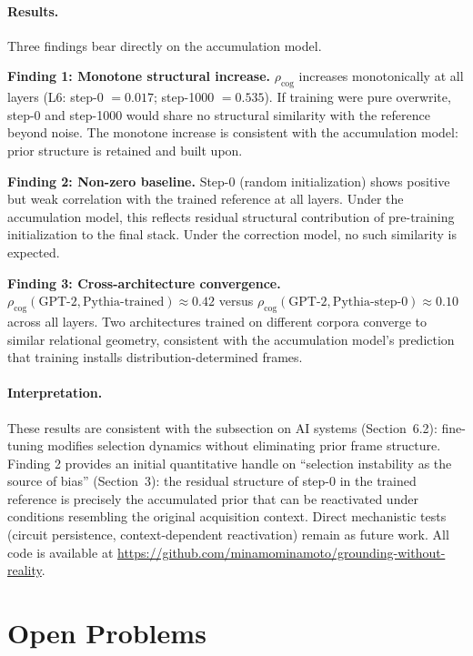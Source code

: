 \documentclass[12pt]{article}
\begin{document}
\paragraph{Results.}
Three findings bear directly on the accumulation model.

\smallskip
\noindent\textbf{Finding 1: Monotone structural increase.}
$\rho_\mathrm{cog}$ increases monotonically at all layers
(L6: step-0 $= 0.017$; step-1000 $= 0.535$).
If training were pure overwrite, step-0 and step-1000 would share
no structural similarity with the reference beyond noise.
The monotone increase is consistent with the accumulation model:
prior structure is retained and built upon.

\smallskip
\noindent\textbf{Finding 2: Non-zero baseline.}
Step-0 (random initialization) shows positive but weak correlation
with the trained reference at all layers.
Under the accumulation model, this reflects residual structural
contribution of pre-training initialization to the final stack.
Under the correction model, no such similarity is expected.

\smallskip
\noindent\textbf{Finding 3: Cross-architecture convergence.}
$\rho_\mathrm{cog}(\text{GPT-2}, \text{Pythia-trained})
\approx 0.42$ versus
$\rho_\mathrm{cog}(\text{GPT-2}, \text{Pythia-step-0})
\approx 0.10$ across all layers.
Two architectures trained on different corpora converge to similar
relational geometry, consistent with the accumulation model's
prediction that training installs distribution-determined frames.

\paragraph{Interpretation.}
These results are consistent with the subsection on AI systems
(Section~6.2): fine-tuning modifies selection dynamics without
eliminating prior frame structure.
Finding 2 provides an initial quantitative handle on
``selection instability as the source of bias'' (Section~3):
the residual structure of step-0 in the trained reference is
precisely the accumulated prior that can be reactivated under
conditions resembling the original acquisition context.
Direct mechanistic tests (circuit persistence, context-dependent
reactivation) remain as future work.
All code is available at
\url{https://github.com/minamominamoto/grounding-without-reality}.

\section{Open Problems}
\end{document}

